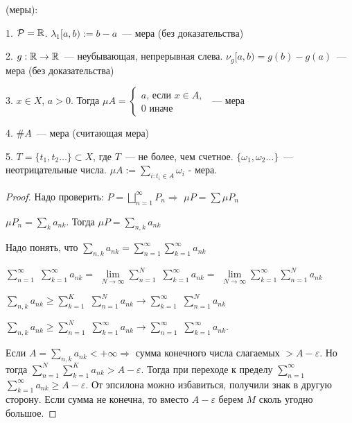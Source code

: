    
   
   \begin{example} (меры):
   
   1. $\mathcal{P} = \mathbb{R}$. $\lambda _1 [a, b) := b - a$~--- мера (без доказательства)
   
   2. $g: \mathbb{R} \to \mathbb{R}$~--- неубывающая, непрерывная слева.
   $\nu _g [a, b) = g(b) - g(a)$~--- мера (без доказательства)
   
   3. $x \in X$, $a > 0$. Тогда $\mu A = 
   \begin{cases}
       a\text{, если }x \in A,\\
       0\text{ иначе}
   \end{cases}$~--- мера
   
   4. $\#A$~--- мера (считающая мера)
   
   5. $T = \{t_1, t_2 \ldots\} \subset X$, где $T$~--- не более, чем счетное.
   $\{\omega_1, \omega_2\ldots\} $~--- неотрицательные числа. 
   $\mu A := \sum \limits_{i: t_i \in A} \omega_i$ - мера.
   \end{example}
   
   \begin{proof}
    Надо проверить: $P = \bigsqcup \limits_{n = 1}^{\infty} P_n \Rightarrow$
   $\mu P = \sum \mu P_n$
   
   $\mu P_n = \sum \limits_{k} a_{nk}$. Тогда $\mu P = \sum \limits_{n, k} a_{nk}$
   
   Надо понять, что $\sum \limits_{n, k} a_{nk} = \sum \limits_{n=1}^{\infty} \sum \limits_{k=1}^{\infty} a_{nk}$
   
   $\sum \limits_{n=1}^{\infty} $
   $\sum \limits_{k=1}^{\infty} a_{nk} = $
   $\lim \limits_{N \to \infty} \sum \limits_{n=1}^{N} $
   $\sum \limits_{k=1}^{\infty} a_{nk} = $
   $\lim \limits_{N \to \infty} \sum \limits_{k=1}^{\infty} \sum \limits_{n=1}^{N} a_{nk}$
   
   $\sum \limits_{n, k} a_{nk} \ge \sum \limits_{k=1}^{K} $
   $\sum \limits_{n=1}^{N} a_{nk} \to \sum \limits_{k=1}^{\infty} $
   $\sum \limits_{n=1}^{N} a_{nk}$
   
   $\sum \limits_{n, k} a_{nk}  \ge \sum \limits_{n=1}^{N} $
   $\sum \limits_{k = 1}^{\infty} a_{nk} \to  \sum \limits_{n=1}^{\infty} $
   $\sum \limits_{k=1}^{\infty} a_{nk}$.
   
   Если $A = \sum \limits_{n, k} a_{nk} < +\infty \Rightarrow$
   сумма конечного числа слагаемых $> A - \varepsilon$. 
   Но тогда  $\sum \limits_{n=1}^{N} \sum \limits_{k=1}^{K} a_{nk} > A - \varepsilon$. 
   Тогда при переходе к пределу 
   $ \sum \limits_{n=1}^{\infty} $
   $\sum \limits_{k=1}^{\infty} a_{nk} \ge  A - \varepsilon$. От эпсилона можно избавиться, получили знак в другую сторону. Если сумма не конечна, то вместо $A - \varepsilon$ берем $M$ сколь угодно большое.
   \end{proof}
   
